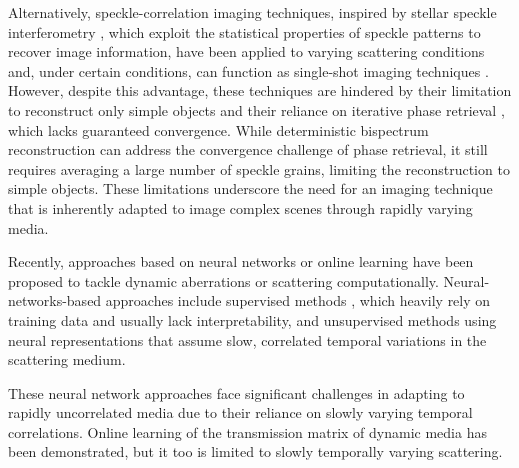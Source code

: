 \documentclass[pdflatex,sn-mathphys-num]{sn-jnl}%
\theoremstyle{thmstyleone}%
\theoremstyle{thmstyletwo}%
\theoremstyle{thmstylethree}%
\begin{document}
Alternatively, speckle-correlation imaging techniques, inspired by stellar speckle interferometry \cite{labeyrie1970attainment}, which exploit the statistical properties of speckle patterns to recover image information, have been applied to varying scattering conditions \cite{labeyrie1970attainment,rosenfeld2021acousto,wang2021non,zhang2023high,guo2023dynamic} and, under certain conditions, can function as single-shot imaging techniques \cite{bert12,katz14, edrei2016optical,salhov2018depth,wang2020imaging,zhu2024non,makowski2024low}. 
However, despite this advantage, these techniques are hindered by their limitation to reconstruct only simple objects and their reliance on iterative phase retrieval \cite{fienup1978reconstruction}, which lacks guaranteed convergence. 
While deterministic bispectrum reconstruction \cite{wu2016single, hwang2019fast, he2023recursion, han2024single} can address the convergence challenge of phase retrieval, it still requires averaging a large number of speckle grains, limiting the reconstruction to simple objects.
These limitations underscore the need for an imaging technique that is inherently adapted to image complex scenes through rapidly varying media.

Recently, approaches based on neural networks or online learning have been proposed to tackle dynamic aberrations or scattering computationally. Neural-networks-based approaches include supervised methods \cite{sun2019image,liu2024learning}, which heavily rely on training data and usually lack interpretability, and unsupervised methods using neural representations \cite{feng23,xie2024wavemo} that assume slow, correlated temporal variations in the scattering medium. 

These neural network approaches face significant challenges in adapting to rapidly uncorrelated media due to their reliance on slowly varying temporal correlations. Online learning of the transmission matrix of dynamic media \cite{valzania2023online} has been demonstrated, but it too is limited to slowly temporally varying scattering.
\end{document}
